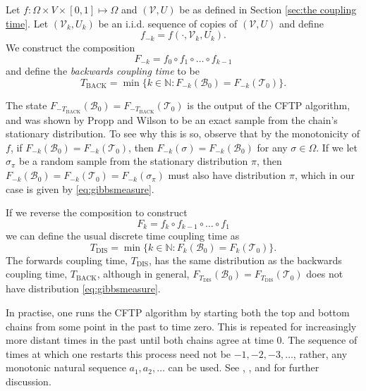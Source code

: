 	Let $f: \Omega \times V \times [0,1] \mapsto \Omega$ and $(\mathcal{V}, U)$ be as defined in Section \ref{sec:the coupling time}. Let $(\mathcal{V}_k, U_k)$ be an i.i.d. sequence of copies of $(\mathcal{V}, U)$ and define 
	\begin{equation}
		f_{-k} = f(\cdot, \mathcal{V}_k, U_k).
	\end{equation}
	We construct the composition
	\begin{equation}
		F_{-k} = f_0 \circ f_1 \circ \dots \circ f_{k-1}
	\end{equation}
	and define the \emph{backwards coupling time} to be
	\begin{equation}
		T_\mathrm{BACK} = \min\{k \in \mathbb{N} : F_{-k}(\mathscr{B}_0) = F_{-k}(\mathscr{T}_0)\}.
	\end{equation}

	The state $F_{-T_\mathrm{BACK}}(\mathscr{B}_0) = F_{-T_\mathrm{BACK}}(\mathscr{T}_0)$ is the output of the CFTP algorithm, and was shown by Propp and Wilson \cite{Propp1996-cf} to be an exact sample from the chain's stationary distribution. To see why this is so, observe that by the monotonicity of $f$, if $F_{-k}(\mathscr{B}_0) = F_{-k}(\mathscr{T}_0)$, then $F_{-k}(\sigma) = F_{-k}(\mathscr{B}_0)$ for any $\sigma \in \Omega$. If we let $\sigma_\pi$ be a random sample from the stationary distribution $\pi$, then $F_{-k}(\mathscr{B}_0) = F_{-k}(\mathscr{T}_0) = F_{-k}(\sigma_\pi)$ must also have distribution $\pi$, which in our case is given by \eqref{eq:gibbsmeasure}.
	
	If we reverse the composition to construct
	\begin{equation}
		F_{k} = f_{k} \circ f_{k-1} \circ \dots \circ f_1
	\end{equation}
	we can define the usual discrete time coupling time as
	\begin{equation}
		T_\mathrm{DIS} =  \min\{k \in \mathbb{N} : F_{k}(\mathscr{B}_0) = F_{k}(\mathscr{T}_0)\}.
	\end{equation}
	The forwards coupling time, $T_\mathrm{DIS}$, has the same distribution as the backwards coupling time, $T_\mathrm{BACK}$, although in general, $F_{T_\mathrm{DIS}}(\mathscr{B}_0) = F_{T_\mathrm{DIS}}(\mathscr{T}_0)$ does not have distribution \eqref{eq:gibbsmeasure}.

	In practise, one runs the CFTP algorithm by starting both the top and bottom chains from some point in the past to time zero. This is repeated for increasingly more distant times in the past until both chains agree at time 0. The sequence of times at which one restarts this process need not be $-1, -2, -3, \dots$, rather, any monotonic natural sequence $a_1, a_2,\dots$ can  be used. See \cite{Levin2009-fo}, \cite{Haggstrom2002-os}, and \cite{Jerrum1998-ph} for further discussion.

